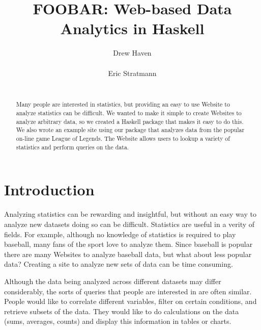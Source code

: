 \documentclass{chi2009}
\begin{document}
\setlength{\paperheight}{11in}
\setlength{\paperwidth}{8.5in}
\setlength{\pdfpageheight}{\paperheight}
\setlength{\pdfpagewidth}{\paperwidth}


\title{FOOBAR: Web-based Data Analytics in Haskell}
\author{
  \alignauthor Drew Haven\\
    \\
  \alignauthor Eric Stratmann\\
    \\
}

\maketitle

\begin{abstract}
Many people are interested in statistics, but providing an easy to use Website to analyze statistics can be difficult. We wanted to make it simple to create Websites to analyze arbitrary data, so we created a Haskell package that makes it easy to do this. We also wrote an example site using our package that analyzes data from the popular on-line game League of Legends. The Website allows users to lookup a variety of statistics and perform queries on the data.
\end{abstract}

\section{Introduction}

Analyzing statistics can be rewarding and insightful, but without an easy way to analyze new datasets doing so can be difficult. Statistics are useful in a verity of fields. For example, although no knowledge of statistics is required to play baseball, many fans of the sport love to analyze them. Since baseball is popular there are many Websites to analyze baseball data, but what about less popular data? Creating a site to analyze new sets of data can be time consuming.

Although the data being analyzed across different datasets may differ considerably, the sorts of queries that people are interested in are often similar. People would like to correlate different variables, filter on certain conditions, and retrieve subsets of the data. They would like to do calculations on the data (sums, averages, counts) and display this information in tables or charts. 
\end{document}
